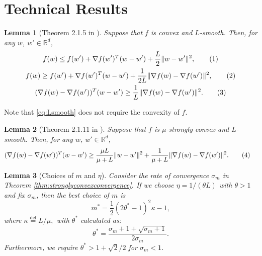 \documentclass{article}
\newtheorem{lem}{Lemma}
\newcommand\tagthis{\addtocounter{equation}{1}\tag{\theequation}}
\newcommand{\eqdef}{\stackrel{\text{def}}{=}}
\renewcommand{\top}{T}
\begin{document}
\clearpage
\onecolumn
\appendix


\section{Technical Results}

\begin{lem}[Theorem 2.1.5 in \cite{nesterov2004}]
\label{lem_tech_01}
Suppose that $f$ is convex and $L$-smooth. Then, for any $w$, $w' \in \mathbb{R}^d$, 
\begin{gather*}
f(w) \leq f(w') + \nabla f(w')^T(w-w') + \frac{L}{2}\|w-w'\|^2,
\tagthis\label{eq:Lsmooth}
\\%
f(w) \geq f(w') + \nabla f(w')^\top (w - w') + \frac{1}{2L}\| \nabla f(w) - \nabla f(w') \|^2, 
\tagthis 
\\%
(\nabla f(w) - \nabla f(w'))^\top (w - w') \geq \frac{1}{L}\| \nabla f(w) - \nabla f(w') \|^2. 
\tagthis\label{ineq_convex} 
\end{gather*}
\end{lem}

Note that \eqref{eq:Lsmooth} does not require the convexity of $f$. 

\begin{lem}[Theorem 2.1.11 in \cite{nesterov2004}]
\label{lem_convex_lowerbound}
Suppose that $f$ is $\mu$-strongly convex and $L$-smooth. Then, for any $w$, $w' \in \mathbb{R}^d$, 
\begin{align*}
&(\nabla f(w) - \nabla f(w'))^\top (w - w') \geq \frac{\mu L}{\mu + L} \|w - w'\|^2  
 + \frac{1}{\mu + L}\| \nabla f(w) - \nabla f(w') \|^2. \tagthis\label{eqdasfsadfsa} 
\end{align*}
\end{lem}

\begin{lem}[Choices of $m$ and $\eta$] \label{lem:complexity}
Consider the rate of convergence $\sigma_m$ in Theorem \ref{thm:stronglyconvexconvergence}. If we choose $\eta = 1/(\theta L)$ with $\theta>1$ and fix $\sigma_m$, then the best choice of $m$ is 
$$m^*=\frac{1}{2}(2\theta^*-1)^2\kappa - 1,$$
where $\kappa\eqdef L/\mu,$ with $\theta^*$ calculated as:
$$\theta^* = \frac{\sigma_m+1+\sqrt{\sigma_m+1}}{2\sigma_m}.$$
Furthermore, we require $\theta^* > 1+\sqrt{2}/2$ for $\sigma_m<1$. 
\end{lem}
 
\end{document}
